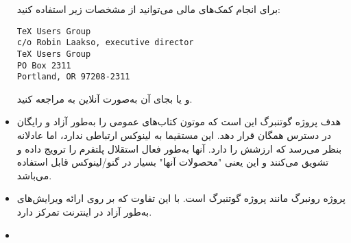 \begin{itemize}
برای انجام کمک‌های مالی می‌توانید از مشخصات زیر استفاده کنید:
\begin{latin}
\begin{tscreen}
\begin{verbatim}
TeX Users Group
c/o Robin Laakso, executive director
TeX Users Group
PO Box 2311
Portland, OR 97208-2311
\end{verbatim}
\end{tscreen}
\end{latin}

و یا بجای آن به‌صورت آنلاین به
مراجعه کنید.

\item
{}

هدف پروژه گوتنبرگ این است که موتون کتاب‌های عمومی را به‌طور آزاد و رایگان
در دسترس همگان قرار دهد. این مستقیما به لینوکس ارتباطی ندارد، اما عادلانه
بنظر می‌رسد که ارزشش را دارد. آنها به‌طور فعال استقلال پلتفرم را ترویج داده
و تشویق می‌کنند و این یعنی "محصولات آنها" بسیار در گنو/لینوکس قابل استفاده می‌باشد.



\item
{}

پروژه رونبرگ مانند پروژه گوتنبرگ است. با این تفاوت که بر روی
ارائه ویرایش‌های
به‌طور آزاد در اینترنت تمرکز دارد.

% 

\item
{}





\end{itemize}
